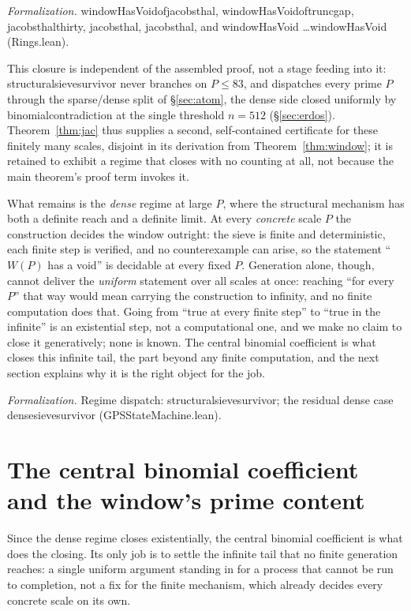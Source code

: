 \documentclass[11pt,a4paper]{amsart}
\theoremstyle{plain}
\theoremstyle{definition}
\theoremstyle{plain}
\theoremstyle{remark}
\newcommand{\lean}[1]{\begingroup\upshape\ttfamily\def\_{\textunderscore\allowbreak}#1\endgroup}
\newcommand{\Formal}[1]{\par\smallskip\noindent\begingroup\raggedright\emph{Formalization.} #1\par\endgroup\smallskip}
\begin{document}
\Formal{\lean{windowHasVoid\_of\_jacobsthal}, \lean{windowHasVoid\_of\_trunc\_gap},
\lean{jacobsthal\_thirty}, \lean{jacobsthal\_210}, \lean{jacobsthal\_2310}, and
\lean{windowHasVoid\_3} \dots \lean{windowHasVoid\_83} (\lean{Rings.lean}).}

This closure is independent of the assembled proof, not a stage feeding into it:
\lean{structural\_sieve\_survivor} never branches on $P\le83$, and dispatches every
prime $P$ through the sparse/dense split of \S\ref{sec:atom}, the dense side closed
uniformly by \lean{binomial\_contradiction} at the single threshold $n=512$
(\S\ref{sec:erdos}). Theorem~\ref{thm:jac} thus supplies a second, self-contained
certificate for these finitely many scales, disjoint in its derivation from
Theorem~\ref{thm:window}; it is retained to exhibit a regime that closes with no
counting at all, not because the main theorem's proof term invokes it.

What remains is the \emph{dense} regime at large $P$, where the structural mechanism has
both a definite reach and a definite limit. At every \emph{concrete} scale $P$ the
construction decides the window outright: the sieve is finite and deterministic, each
finite step is verified, and no counterexample can arise, so the statement
\enquote{$W(P)$ has a void} is decidable at every fixed $P$. Generation alone, though,
cannot deliver the \emph{uniform} statement over all scales at once: reaching
\enquote{for every $P$} that way would mean carrying the construction to infinity, and no
finite computation does that. Going from \enquote{true at every finite step} to
\enquote{true in the infinite} is an existential step, not a computational one, and we
make no claim to close it generatively; none is known. The central binomial coefficient
is what closes this infinite tail, the part beyond any finite computation, and the next
section explains why it is the right object for the job.

\Formal{Regime dispatch: \lean{structural\_sieve\_survivor}; the residual dense case
\lean{dense\_sieve\_survivor} (\lean{GPS\_StateMachine.lean}).}

\section{The central binomial coefficient and the window's prime content}
\label{sec:newton}

Since the dense regime closes existentially, the central binomial coefficient is what does
the closing. Its only job is to settle the infinite tail that no finite generation
reaches: a single uniform argument standing in for a process that cannot be run to
completion, not a fix for the finite mechanism, which already decides every concrete scale
on its own.
\end{document}

